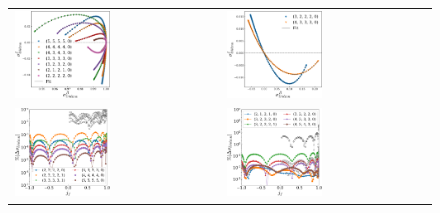 \documentclass[twocolumn,aps,prd,floatfix,preprintnumbers,a4paper,nofootinbib,
superscriptaddress,10pt]{revtex4-1}
\begin{document}
\begin{figure}[htb]
  \begin{tabular}{ll}
    \hspace{-0.21cm}\includegraphics[width=0.48\textwidth]{issue2_ysprod_1.pdf} & \includegraphics[width=0.48\textwidth]{issue2_ysprod_2.pdf} \\
    \includegraphics[width=0.48\textwidth]{issue2_ysprod_3v2.pdf} & \hspace{0.3cm}\includegraphics[width=0.48\textwidth]{issue2_ysprod_4v2.pdf}

\end{tabular}
\end{figure}
\end{document}
